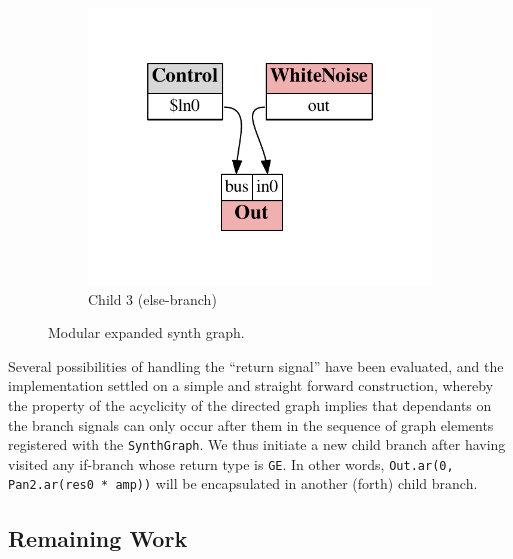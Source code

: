 \documentclass[11pt,a4paper]{article}
\begin{document}
\begin{figure}
\begin{subfigure}[b]{0.3\textwidth}
\includegraphics[scale=0.5]{figures/ugen-if-mod-child_3.pdf}
\caption{Child 3 (else-branch)}\label{fig:ugen-mod-c3}
\end{subfigure}
\caption{Modular expanded synth graph.}
\label{fig:ugen-modular}
\end{figure}

Several possibilities of handling the ``return signal'' have been evaluated, and the implementation settled on a simple and straight forward construction, whereby the property of the acyclicity of the directed graph implies that dependants on the branch signals can only occur after them in the sequence of graph elements registered with the \Verb!SynthGraph!. We thus initiate a new child branch after having visited any if-branch whose return type is \Verb!GE!. In other words, \Verb!Out.ar(0, Pan2.ar(res0 * amp))! will be encapsulated in another (forth) child branch.

\pagebreak
\subsection*{Remaining Work}
\end{document}
